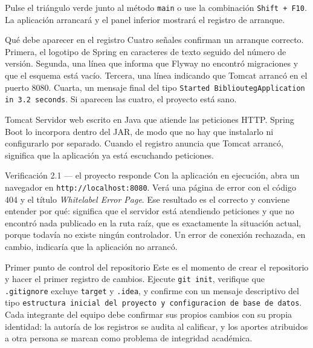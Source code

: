 \documentclass[11pt,a4paper,openany]{book}
\begin{document}
Pulse el triángulo verde junto al método \texttt{main} o use la combinación \texttt{Shift + F10}. La aplicación arrancará y el panel inferior mostrará el registro de arranque.

\begin{cajaejemplo}{Qué debe aparecer en el registro}
	Cuatro señales confirman un arranque correcto. Primera, el logotipo de Spring en caracteres de texto seguido del número de versión. Segunda, una línea que informa que Flyway no encontró migraciones y que el esquema está vacío. Tercera, una línea indicando que Tomcat arrancó en el puerto 8080. Cuarta, un mensaje final del tipo \texttt{Started BiblioutegApplication in 3.2 seconds}. Si aparecen las cuatro, el proyecto está sano.
\end{cajaejemplo}

\begin{cajadefinicion}{Tomcat}
	Servidor web escrito en Java que atiende las peticiones HTTP. Spring Boot lo incorpora dentro del JAR, de modo que no hay que instalarlo ni configurarlo por separado. Cuando el registro anuncia que Tomcat arrancó, significa que la aplicación ya está escuchando peticiones.
\end{cajadefinicion}

\begin{cajaejercicio}{Verificación 2.1 --- el proyecto responde}
	Con la aplicación en ejecución, abra un navegador en \texttt{http://localhost:8080}. Verá una página de error con el código 404 y el título \emph{Whitelabel Error Page}. Ese resultado es el correcto y conviene entender por qué: significa que el servidor está atendiendo peticiones y que no encontró nada publicado en la ruta raíz, que es exactamente la situación actual, porque todavía no existe ningún controlador. Un error de conexión rechazada, en cambio, indicaría que la aplicación no arrancó.
\end{cajaejercicio}

\begin{cajabuenas}{Primer punto de control del repositorio}
	Este es el momento de crear el repositorio y hacer el primer registro de cambios. Ejecute \texttt{git init}, verifique que \texttt{.gitignore} excluye \texttt{target} y \texttt{.idea}, y confirme con un mensaje descriptivo del tipo \texttt{estructura inicial del proyecto y configuracion de base de datos}. Cada integrante del equipo debe confirmar sus propios cambios con su propia identidad: la autoría de los registros se audita al calificar, y los aportes atribuidos a otra persona se marcan como problema de integridad académica.
\end{cajabuenas}
\end{document}
